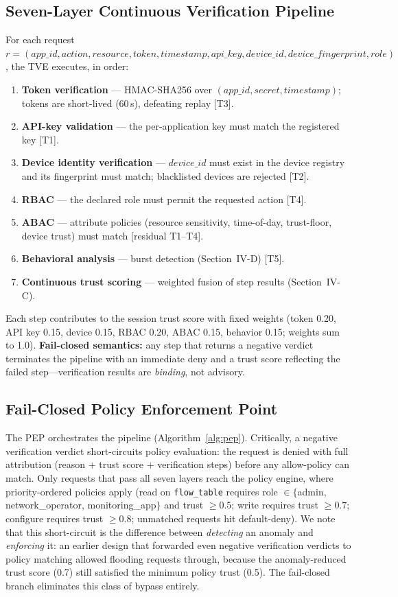\documentclass[journal]{IEEEtran}
\begin{document}
\subsection{Seven-Layer Continuous Verification Pipeline}
For each request $r=(\mathit{app\_id}, \mathit{action}, \mathit{resource}, \mathit{token}, \mathit{timestamp}, \mathit{api\_key}, \mathit{device\_id}, \mathit{device\_fingerprint}, \mathit{role})$, the TVE executes, in order:
\begin{enumerate}
\item \textbf{Token verification} --- HMAC-SHA256 over $(\mathit{app\_id},\mathit{secret},\mathit{timestamp})$; tokens are short-lived (60\,s), defeating replay [T3].
\item \textbf{API-key validation} --- the per-application key must match the registered key [T1].
\item \textbf{Device identity verification} --- $\mathit{device\_id}$ must exist in the device registry and its fingerprint must match; blacklisted devices are rejected [T2].
\item \textbf{RBAC} --- the declared role must permit the requested action [T4].
\item \textbf{ABAC} --- attribute policies (resource sensitivity, time-of-day, trust-floor, device trust) must match [residual T1--T4].
\item \textbf{Behavioral analysis} --- burst detection (Section~IV-D) [T5].
\item \textbf{Continuous trust scoring} --- weighted fusion of step results (Section~IV-C).
\end{enumerate}
Each step contributes to the session trust score with fixed weights (token 0.20, API key 0.15, device 0.15, RBAC 0.20, ABAC 0.15, behavior 0.15; weights sum to 1.0). \textbf{Fail-closed semantics:} any step that returns a negative verdict terminates the pipeline with an immediate deny and a trust score reflecting the failed step---verification results are \emph{binding}, not advisory.

\subsection{Fail-Closed Policy Enforcement Point}
The PEP orchestrates the pipeline (Algorithm~\ref{alg:pep}). Critically, a negative verification verdict short-circuits policy evaluation: the request is denied with full attribution (reason + trust score + verification steps) before any allow-policy can match. Only requests that pass all seven layers reach the policy engine, where priority-ordered policies apply (read on \texttt{flow\_table} requires role $\in \{$admin, network\_operator, monitoring\_app$\}$ and trust $\geq 0.5$; write requires trust $\geq 0.7$; configure requires trust $\geq 0.8$; unmatched requests hit default-deny). We note that this short-circuit is the difference between \emph{detecting} an anomaly and \emph{enforcing} it: an earlier design that forwarded even negative verification verdicts to policy matching allowed flooding requests through, because the anomaly-reduced trust score (0.7) still satisfied the minimum policy trust (0.5). The fail-closed branch eliminates this class of bypass entirely.
\end{document}
